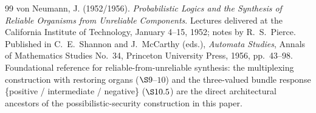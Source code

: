 \documentclass[11pt,a4paper]{article}
\theoremstyle{definition}
\theoremstyle{remark}
\begin{document}
\begin{thebibliography}{99}
von Neumann, J. (1952/1956).
\emph{Probabilistic Logics and the Synthesis of Reliable Organisms from Unreliable Components}.
Lectures delivered at the California Institute of Technology, January 4--15, 1952; notes by R.~S.~Pierce.
Published in C.~E.~Shannon and J.~McCarthy (eds.), \emph{Automata Studies}, Annals of Mathematics Studies No.~34, Princeton University Press, 1956, pp.~43--98.
Foundational reference for reliable-from-unreliable synthesis: the multiplexing construction with restoring organs ($\S9$--$10$) and the three-valued bundle response \{positive / intermediate / negative\} ($\S10.5$) are the direct architectural ancestors of the possibilistic-security construction in this paper.

\end{thebibliography}
\end{document}
